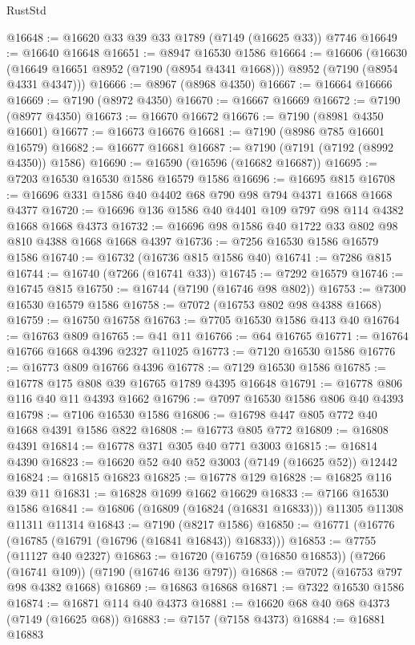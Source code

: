 \begin{lexlean}{RustStd}
\begin{coremodule}
@16648 := @16620 @33 @39 @33 @1789 (@7149 (@16625 @33)) @7746
@16649 := @16640 @16648
@16651 := @8947 @16530 @1586
@16664 := @16606
    (@16630 (@16649 @16651 @8952 (@7190 (@8954 @4341 @1668))) @8952 (@7190 (@8954 @4331 @4347)))
@16666 := @8967 (@8968 @4350)
@16667 := @16664 @16666
@16669 := @7190 (@8972 @4350)
@16670 := @16667 @16669
@16672 := @7190 (@8977 @4350)
@16673 := @16670 @16672
@16676 := @7190 (@8981 @4350 @16601)
@16677 := @16673 @16676
@16681 := @7190 (@8986 @785 @16601 @16579)
@16682 := @16677 @16681
@16687 := @7190 (@7191 (@7192 (@8992 @4350)) @1586)
@16690 := @16590 (@16596 (@16682 @16687))
@16695 := @7203 @16530 @16530 @1586 @16579 @1586
@16696 := @16695 @815
@16708 := @16696 @331 @1586 @40 @4402 @68 @790 @98 @794 @4371 @1668 @1668 @4377
@16720 := @16696 @136 @1586 @40 @4401 @109 @797 @98 @114 @4382 @1668 @1668 @4373
@16732 := @16696 @98 @1586 @40 @1722 @33 @802 @98 @810 @4388 @1668 @1668 @4397
@16736 := @7256 @16530 @1586 @16579 @1586
@16740 := @16732 (@16736 @815 @1586 @40)
@16741 := @7286 @815
@16744 := @16740 (@7266 (@16741 @33))
@16745 := @7292 @16579
@16746 := @16745 @815
@16750 := @16744 (@7190 (@16746 @98 @802))
@16753 := @7300 @16530 @16579 @1586
@16758 := @7072 (@16753 @802 @98 @4388 @1668)
@16759 := @16750 @16758
@16763 := @7705 @16530 @1586 @413 @40
@16764 := @16763 @809
@16765 := @41 @11
@16766 := @64 @16765
@16771 := @16764 @16766 @1668 @4396 @2327 @11025
@16773 := @7120 @16530 @1586
@16776 := @16773 @809 @16766 @4396
@16778 := @7129 @16530 @1586
@16785 := @16778 @175 @808 @39 @16765 @1789 @4395 @16648
@16791 := @16778 @806 @116 @40 @11 @4393 @1662
@16796 := @7097 @16530 @1586 @806 @40 @4393
@16798 := @7106 @16530 @1586
@16806 := @16798 @447 @805 @772 @40 @1668 @4391 @1586 @822
@16808 := @16773 @805 @772
@16809 := @16808 @4391
@16814 := @16778 @371 @305 @40 @771 @3003
@16815 := @16814 @4390
@16823 := @16620 @52 @40 @52 @3003 (@7149 (@16625 @52)) @12442
@16824 := @16815 @16823
@16825 := @16778 @129
@16828 := @16825 @116 @39 @11
@16831 := @16828 @1699 @1662 @16629
@16833 := @7166 @16530 @1586
@16841 := @16806 (@16809 (@16824 (@16831 @16833))) @11305 @11308 @11311 @11314
@16843 := @7190 (@8217 @1586)
@16850 := @16771 (@16776 (@16785 (@16791 (@16796 (@16841 @16843)) @16833)))
@16853 := @7755 (@11127 @40 @2327)
@16863 := @16720 (@16759 (@16850 @16853)) (@7266 (@16741 @109)) (@7190 (@16746 @136 @797))
@16868 := @7072 (@16753 @797 @98 @4382 @1668)
@16869 := @16863 @16868
@16871 := @7322 @16530 @1586
@16874 := @16871 @114 @40 @4373
@16881 := @16620 @68 @40 @68 @4373 (@7149 (@16625 @68))
@16883 := @7157 (@7158 @4373)
@16884 := @16881 @16883

\end{coremodule}
\end{lexlean}
